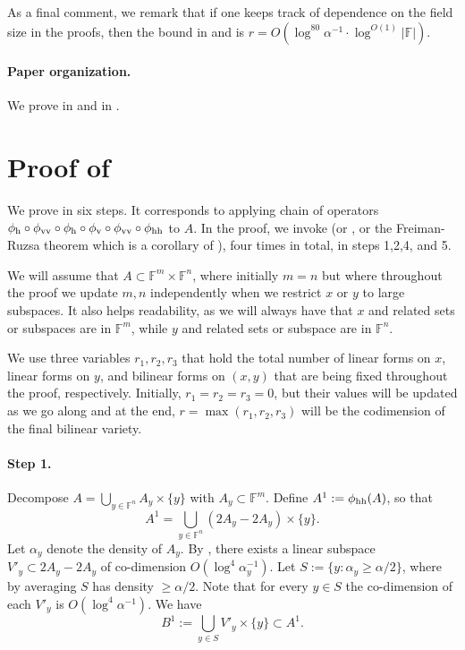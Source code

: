 \documentclass[12pt]{article}
\newcommand{\F}{\mathbb{F}}
\newcommand{\hr}{\textup{h}}
\newcommand{\vr}{\textup{v}}
\begin{document}
As a final comment, we remark that if one keeps track of dependence on the field size in the proofs, then the bound in  and 
is  $r = O(\log^{80}\alpha^{-1} \cdot \log^{O(1)} |\F|)$.

\paragraph*{Paper organization.} We prove  in  and  in .

\section{Proof of }
\label{section:main}

We prove  in six steps. It corresponds to applying chain of operators $\phi_{\hr} \circ \phi_{\vr\vr} \circ \phi_\hr \circ \phi_\vr \circ \phi_{\vr\vr}\circ \phi_{\hr\hr}$ to $A$. In the proof, we invoke  (or , or the Freiman-Ruzsa theorem which is a corollary of ), four times in total, in steps 1,2,4, and 5.

We will assume that $A \subset \F^m \times \F^n$, where initially $m=n$ but where throughout the proof we update $m,n$ independently when we restrict $x$ or $y$ to large subspaces. It also helps readability, as we will always have that $x$ and related sets or subspaces are in $\F^m$,
while $y$ and related sets or subspace are in $\F^n$.

We use three variables $r_1,r_2,r_3$ that hold the total number of linear forms on $x$, linear forms on $y$, and bilinear forms on $(x,y)$ that are being fixed throughout the proof, respectively. Initially, $r_1=r_2=r_3=0$, but their values will be updated as we go along and at the end, $r = \max(r_1,r_2,r_3)$ will be the codimension of the final bilinear variety.

\paragraph{Step 1.}
Decompose $A = \bigcup_{y \in \F^n} A_y \times \{y\}$ with $A_y \subset \F^m$. Define $A^1 := \phi_{\hr\hr}(A)$, so that
$$
A^1 = \bigcup_{y \in \F^n} (2A_y - 2A_y) \times \{y\}.
$$
Let $\alpha_y$ denote the density of $A_y$. By ,
there exists a linear subspace $V'_y \subset 2 A_y - 2A_y$ of co-dimension $ O(\log^4\alpha_y^{-1})$.
Let $S:=\{y: \alpha_y \ge \alpha/2\}$, where by averaging $S$ has density $\ge \alpha/2$.
Note that for every $y \in S$ the co-dimension of each $V'_y$ is $O(\log^4\alpha^{-1})$.
We have
$$
B^1 := \bigcup_{y \in S} V'_y \times \{y\} \subset A^1.
$$
\end{document}
